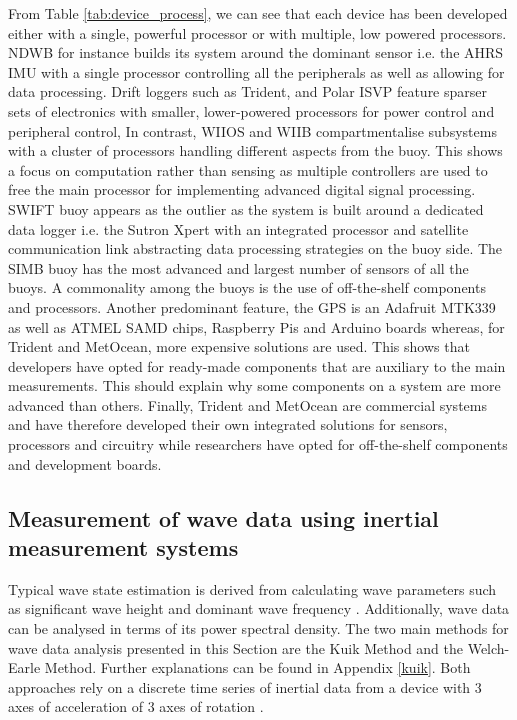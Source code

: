 From Table \ref{tab:device_process}, we can see that each device has been developed either with a single, powerful processor or with multiple, low powered processors. NDWB for instance builds its system around the dominant sensor i.e. the AHRS IMU with a single processor controlling all the peripherals as well as allowing for data processing. Drift loggers such as Trident, and Polar ISVP feature sparser sets of electronics with smaller, lower-powered processors for power control and peripheral control, In contrast, WIIOS and WIIB compartmentalise subsystems with a cluster of processors handling different aspects from the buoy. This shows a focus on computation rather than sensing as multiple controllers are used to free the main processor for implementing advanced digital signal processing. SWIFT buoy appears as the outlier as the system is built around a dedicated data logger i.e. the Sutron Xpert with an integrated processor and satellite communication link abstracting data processing strategies on the buoy side. The SIMB buoy has the most advanced and largest number of sensors of all the buoys. A commonality among the buoys is the use of off-the-shelf components and processors. Another predominant feature, the GPS is an Adafruit MTK339 as well as ATMEL SAMD chips, Raspberry Pis and Arduino boards whereas, for Trident and MetOcean, more expensive solutions are used. This shows that developers have opted for ready-made components that are auxiliary to the main measurements. This should explain why some components on a system are more advanced than others. Finally, Trident and MetOcean are commercial systems and have therefore developed their own integrated solutions for sensors, processors and circuitry while researchers have opted for off-the-shelf components and development boards.



\subsection{Measurement of wave data using inertial measurement systems}
\label{subsec:ch2_wavemeas}
Typical wave state estimation is derived from calculating wave parameters such as significant wave height and dominant wave frequency \cite{williams2013wave}. Additionally, wave data can be analysed in terms of its power spectral density. The two main methods for wave data analysis presented in this Section are the Kuik Method and the Welch-Earle Method. Further explanations can be found in Appendix \ref{kuik}. Both approaches rely on a discrete time series of inertial data from a device with 3 axes of acceleration of 3 axes of rotation \cite{kuik1988method,earle1996nondirectional}.

